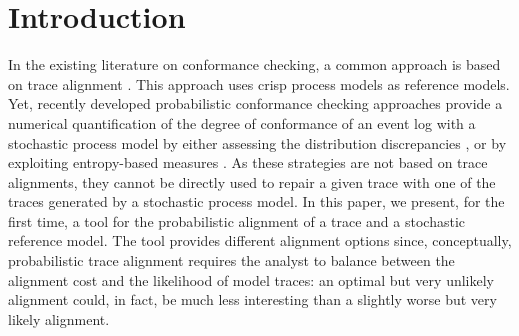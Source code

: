 

\section{Introduction}
\label{introduction}
%
In the existing literature on conformance checking, a common approach is based on trace alignment \cite{DBLP:conf/edoc/AdriansyahDA11}. This approach uses crisp process models as reference models. Yet, recently developed probabilistic conformance checking approaches provide a numerical quantification of the degree of conformance
of an event log with a stochastic process model by either assessing the distribution discrepancies \cite{DBLP:conf/bpm/LeemansSA19}, or by exploiting entropy-based measures \cite{DBLP:conf/icpm/PolyvyanyyK19,DBLP:journals/tosem/PolyvyanyySWCM20}.
As these strategies are not based on trace alignments, they cannot be directly used to repair a given trace with one of the traces generated by a stochastic process model.
%
In this paper, we present, for the first time, a tool for the probabilistic alignment of a trace and a stochastic reference
model. %
The tool provides different alignment options since, conceptually, probabilistic trace alignment requires the analyst to
balance between the alignment cost and the likelihood of model traces: an optimal but very unlikely alignment could, in fact, be much less interesting than a slightly worse but very likely alignment.

